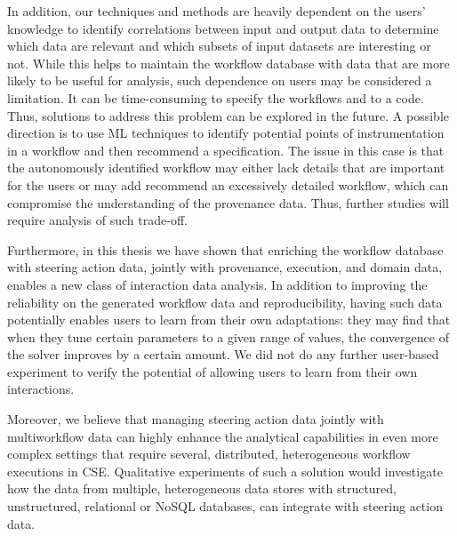 In addition, our techniques and methods are  
heavily dependent on the users’ knowledge
to identify correlations between input and output data to determine which data are relevant
and which subsets of input datasets are interesting or not.
While this helps to maintain the workflow database with data that are more likely to be useful for analysis, such dependence on users
may be considered a limitation. It can be time-consuming to specify the workflows and to a code.
Thus, solutions to address this problem can be explored in the future.
A possible direction is to use ML techniques to identify 
potential points of instrumentation in a workflow and then recommend a specification. The issue in this case is that the autonomously identified workflow may either lack details that are important for the users or may add 
recommend an excessively detailed workflow, which can compromise the understanding of the provenance data. Thus, further studies will require analysis of such trade-off.

Furthermore, in this thesis we have shown that enriching the workflow database with steering action data,
jointly with provenance, execution, and domain data, enables a new class of interaction data
analysis.
In addition to improving the reliability on the generated workflow data and reproducibility, having such
data potentially enables users to learn from their own adaptations: they may find
that when they tune certain parameters to a given range of values, the
convergence of the solver improves by a certain amount.
We did not do any further user-based experiment to verify the potential of allowing users to learn from their own interactions.

Moreover, we believe that managing steering action data jointly with multiworkflow data \cite{souza_efficient_2019} can highly enhance the analytical capabilities in even more complex settings that require several, distributed, heterogeneous workflow executions in CSE.  Qualitative experiments of such a solution would investigate how the data from multiple, heterogeneous data stores with structured, unstructured, relational or NoSQL databases, can integrate with steering action data.

